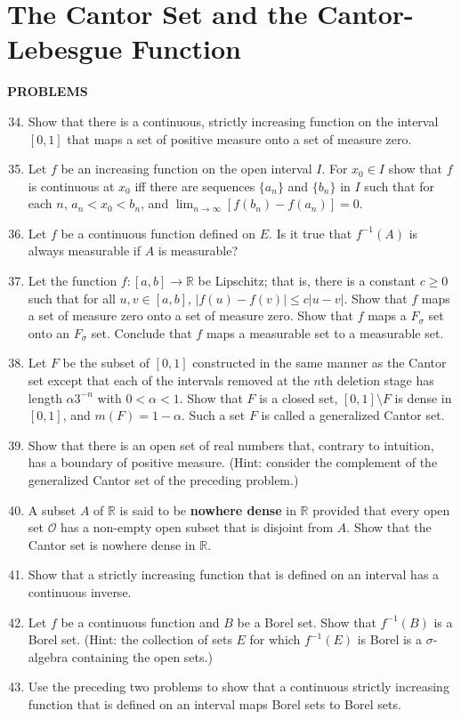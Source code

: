 \section{The Cantor Set and the Cantor-Lebesgue Function}
\begin{center}
	\textbf{PROBLEMS}
\end{center}
\begin{enumerate}
	\setcounter{enumi}{33}
	\item Show that there is a continuous, strictly increasing function on the interval $[0,1]$ that maps a set of positive measure onto a set of measure zero.
	\item Let $f$ be an increasing function on the open interval $I$. For $x_0\in I$ show that $f$ is continuous at $x_0$ iff there are sequences $\{a_n\}$ and $\{b_n\}$ in $I$ such that for each $n$, $a_n<x_0<b_n$, and $\lim_{n\to\infty}[f(b_n)-f(a_n)]=0$.
	\item Let $f$ be a continuous function defined on $E$. Is it true that $f^{-1}(A)$ is always measurable if $A$ is measurable?
	\item Let the function $f:[a,b]\to\mathbb{R}$ be Lipschitz; that is, there is a constant $c\ge0$ such that for all $u,v\in[a,b]$, $|f(u)-f(v)|\le c|u-v|$.
	Show that $f$ maps a set of measure zero onto a set of measure zero. Show that $f$ maps a $F_\sigma$ set onto an $F_\sigma$ set. Conclude that $f$ maps a measurable set to a measurable set.
	\item Let $F$ be the subset of $[0,1]$ constructed in the same manner as the Cantor set except that each of the intervals removed at the $n$th deletion stage has length $\alpha 3^{-n}$ with $0<\alpha<1$.
	Show that $F$ is a closed set, $[0,1]\setminus F$ is dense in $[0,1]$, and $m(F)=1-\alpha$. Such a set $F$ is called a generalized Cantor set.
	\item Show that there is an open set of real numbers that, contrary to intuition, has a boundary of positive measure. (Hint: consider the complement of the generalized Cantor set of the preceding problem.)
	\item A subset $A$ of $\mathbb{R}$ is said to be \textbf{nowhere dense} in $\mathbb{R}$ provided that every open set $\mathcal{O}$ has a non-empty open subset that is disjoint from $A$. Show that the Cantor set is nowhere dense in $\mathbb{R}$.
	\item Show that a strictly increasing function that is defined on an interval has a continuous inverse.
	\item Let $f$ be a continuous function and $B$ be a Borel set. Show that $f^{-1}(B)$ is a Borel set. (Hint: the collection of sets $E$ for which $f^{-1}(E)$ is Borel is a $\sigma$-algebra containing the open sets.)
	\item Use the preceding two problems to show that a continuous strictly increasing function that is defined on an interval maps Borel sets to Borel sets.
\end{enumerate}	
